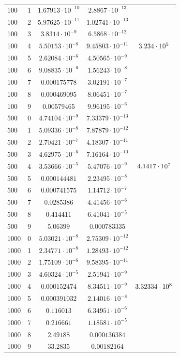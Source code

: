 \documentclass[english]{article}
\begin{document}
\begin{center}
\begin{longtable}{l|l|c|c|c}
    100 & 1 & \(1.67913\cdot 10^{-10}\) & \(2.8867\cdot 10^{-13}\) & \\
    100 & 2 & \(5.97625\cdot 10^{-11}\) & \(1.02741\cdot 10^{-13}\) & \\
    100 & 3 & \(3.8314\cdot 10^{-9}\) & \(6.5868\cdot 10^{-12}\) & \\
    100 & 4 & \(5.50153\cdot 10^{-8}\) & \(9.45803\cdot 10^{-11}\) & \(\large 3.234 \cdot 10^5\) \\
    100 & 5 & \(2.62084\cdot 10^{-6}\) & \(4.50565\cdot 10^{-9}\) & \\
    100 & 6 & \(9.08835\cdot 10^{-6}\) & \(1.56243\cdot 10^{-8}\) & \\
    100 & 7 & \(0.000175778\) & \(3.02191\cdot 10^{-7}\) & \\
    100 & 8 & \(0.000469095\) & \(8.06451\cdot 10^{-7}\) & \\
    100 & 9 & \(0.00579465\) & \(9.96195\cdot 10^{-6}\) & \\
    \hline
    500 & 0 & \(4.74104\cdot 10^{-9}\) & \(7.33379\cdot 10^{-13}\) & \\
    500 & 1 & \(5.09336\cdot 10^{-8}\) & \(7.87879\cdot 10^{-12}\) & \\
    500 & 2 & \(2.70421\cdot 10^{-7}\) & \(4.18307\cdot 10^{-11}\) & \\
    500 & 3 & \(4.62975\cdot 10^{-6}\) & \(7.16164\cdot 10^{-10}\) & \\
    500 & 4 & \(3.53666\cdot 10^{-5}\) & \(5.47076\cdot 10^{-9}\) & \(\large 4.1417 \cdot 10^7 \) \\
    500 & 5 & \(0.000144481\) & \(2.23495\cdot 10^{-8}\) & \\
    500 & 6 & \(0.000741575\) & \(1.14712\cdot 10^{-7}\) & \\
    500 & 7 & \(0.0285386\) & \(4.41456\cdot 10^{-6}\) & \\
    500 & 8 & \(0.414411\) & \(6.41041\cdot 10^{-5}\) & \\
    500 & 9 & \(5.06399\) & \(0.000783335\) & \\
    \hline
    1000 & 0 & \(5.03021\cdot 10^{-8}\) & \(2.75309\cdot 10^{-12}\) & \\
    1000 & 1 & \(2.34771\cdot 10^{-8}\) & \(1.28493\cdot 10^{-12}\) & \\
    1000 & 2 & \(1.75109\cdot 10^{-6}\) & \(9.58395\cdot 10^{-11}\) & \\
    1000 & 3 & \(4.60324\cdot 10^{-5}\) & \(2.51941\cdot 10^{-9}\) & \\
    1000 & 4 & \(0.000152474\) & \(8.34511\cdot 10^{-9}\) & \(\large 3.32334 \cdot 10^8 \) \\
    1000 & 5 & \(0.000391032\) & \(2.14016\cdot 10^{-8}\) & \\
    1000 & 6 & \(0.116013\) & \(6.34951\cdot 10^{-6}\) & \\
    1000 & 7 & \(0.216661\) & \(1.18581\cdot 10^{-5}\) & \\
    1000 & 8 & \(2.49188\) & \(0.000136384\) & \\
    1000 & 9 & \(33.2835\) & \(0.00182164\)
  \end{longtable}
\end{center}
\end{document}

